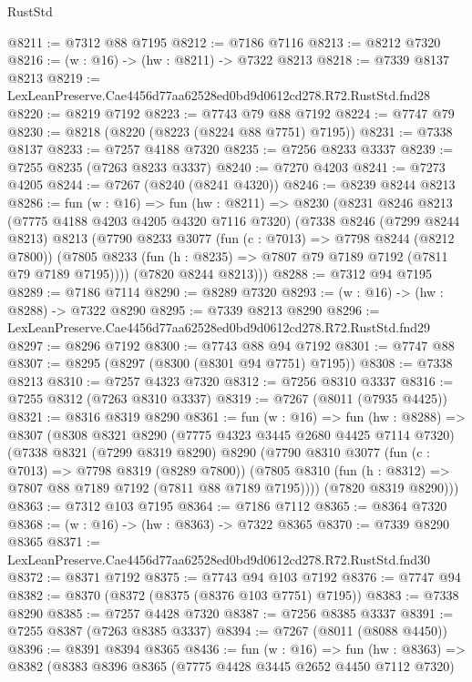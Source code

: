 \begin{lexlean}{RustStd}
\begin{coremodule}
@8211 := @7312 @88 @7195
@8212 := @7186 @7116
@8213 := @8212 @7320
@8216 := (w : @16) -> (hw : @8211) -> @7322 @8213
@8218 := @7339 @8137 @8213
@8219 := LexLeanPreserve.Cae4456d77aa62528ed0bd9d0612cd278.R72.RustStd.fnd28
@8220 := @8219 @7192
@8223 := @7743 @79 @88 @7192
@8224 := @7747 @79
@8230 := @8218 (@8220 (@8223 (@8224 @88 @7751) @7195))
@8231 := @7338 @8137
@8233 := @7257 @4188 @7320
@8235 := @7256 @8233 @3337
@8239 := @7255 @8235 (@7263 @8233 @3337)
@8240 := @7270 @4203
@8241 := @7273 @4205
@8244 := @7267 (@8240 (@8241 @4320))
@8246 := @8239 @8244 @8213
@8286 := fun (w : @16) =>
  fun (hw : @8211) =>
  @8230
    (@8231
      @8246
      @8213
      (@7775 @4188 @4203 @4205 @4320 @7116 @7320)
      (@7338
        @8246
        (@7299 @8244 @8213)
        @8213
        (@7790
          @8233
          @3077
          (fun (c : @7013) => @7798 @8244 (@8212 @7800))
          (@7805 @8233 (fun (h : @8235) => @7807 @79 @7189 @7192 (@7811 @79 @7189 @7195))))
        (@7820 @8244 @8213)))
@8288 := @7312 @94 @7195
@8289 := @7186 @7114
@8290 := @8289 @7320
@8293 := (w : @16) -> (hw : @8288) -> @7322 @8290
@8295 := @7339 @8213 @8290
@8296 := LexLeanPreserve.Cae4456d77aa62528ed0bd9d0612cd278.R72.RustStd.fnd29
@8297 := @8296 @7192
@8300 := @7743 @88 @94 @7192
@8301 := @7747 @88
@8307 := @8295 (@8297 (@8300 (@8301 @94 @7751) @7195))
@8308 := @7338 @8213
@8310 := @7257 @4323 @7320
@8312 := @7256 @8310 @3337
@8316 := @7255 @8312 (@7263 @8310 @3337)
@8319 := @7267 (@8011 (@7935 @4425))
@8321 := @8316 @8319 @8290
@8361 := fun (w : @16) =>
  fun (hw : @8288) =>
  @8307
    (@8308
      @8321
      @8290
      (@7775 @4323 @3445 @2680 @4425 @7114 @7320)
      (@7338
        @8321
        (@7299 @8319 @8290)
        @8290
        (@7790
          @8310
          @3077
          (fun (c : @7013) => @7798 @8319 (@8289 @7800))
          (@7805 @8310 (fun (h : @8312) => @7807 @88 @7189 @7192 (@7811 @88 @7189 @7195))))
        (@7820 @8319 @8290)))
@8363 := @7312 @103 @7195
@8364 := @7186 @7112
@8365 := @8364 @7320
@8368 := (w : @16) -> (hw : @8363) -> @7322 @8365
@8370 := @7339 @8290 @8365
@8371 := LexLeanPreserve.Cae4456d77aa62528ed0bd9d0612cd278.R72.RustStd.fnd30
@8372 := @8371 @7192
@8375 := @7743 @94 @103 @7192
@8376 := @7747 @94
@8382 := @8370 (@8372 (@8375 (@8376 @103 @7751) @7195))
@8383 := @7338 @8290
@8385 := @7257 @4428 @7320
@8387 := @7256 @8385 @3337
@8391 := @7255 @8387 (@7263 @8385 @3337)
@8394 := @7267 (@8011 (@8088 @4450))
@8396 := @8391 @8394 @8365
@8436 := fun (w : @16) =>
  fun (hw : @8363) =>
  @8382
    (@8383
      @8396
      @8365
      (@7775 @4428 @3445 @2652 @4450 @7112 @7320)

\end{coremodule}
\end{lexlean}
